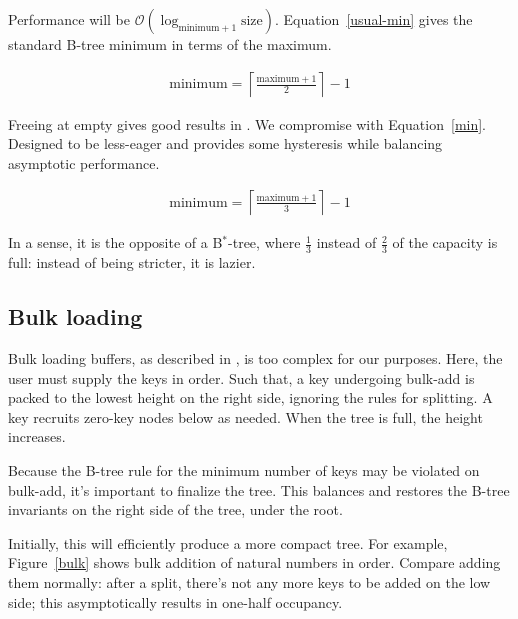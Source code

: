\documentclass[12pt]{article}
\begin{document}
Performance will be
$\mathcal{O}(\log_{\text{minimum}+1} \text{size})$. Equation~\ref{usual-min} gives the standard B-tree minimum in terms of the maximum.

\begin{align}
\text{minimum} = \left\lceil \frac{\text{maximum}+1}{2} \right\rceil - 1 \label{usual-min}
\end{align}

Freeing at empty gives good results in \cite{johnson1993b}. We compromise with Equation~\ref{min}. Designed to be less-eager and provides some hysteresis while balancing asymptotic performance.

\begin{align}
\text{minimum} = \left\lceil \frac{\text{maximum}+1}{3} \right\rceil - 1 \label{min}
\end{align}

In a sense, it is the opposite of a B$^*$-tree\cite{knuth1998sorting, comer1979ubiquitous}, where $\frac{1}{3}$ instead of $\frac{2}{3}$ of the capacity is full: instead of being stricter, it is lazier.

\subsection{Bulk loading}

Bulk loading buffers, as described in \cite{graefe2011modern}, is too complex for our purposes. Here, the user must supply the keys in order. Such that, a key undergoing bulk-add is packed to the lowest height on the right side, ignoring the rules for splitting. A key recruits zero-key nodes below as needed. When the tree is full, the height increases.

Because the B-tree rule for the minimum number of keys may be violated on bulk-add, it's important to finalize the tree. This balances and restores the B-tree invariants on the right side of the tree, under the root.

Initially, this will efficiently produce a more compact tree. For example, Figure~\ref{bulk} shows bulk addition of natural numbers in order. Compare adding them normally: after a split, there's not any more keys to be added on the low side; this asymptotically results in one-half occupancy.
\end{document}
